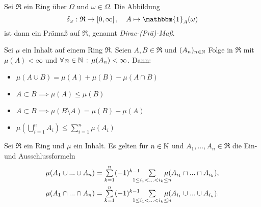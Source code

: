 \documentclass{cheat-sheet}
\newcommand{\Ring}{\mathfrak{R}} %
\newcommand{\ind}{\mathbbm{1}} %
\begin{document}
\begin{bsp}
  Sei $\Ring$ ein Ring über $\Omega$ und $\omega \in \Omega$. Die Abbildung
  \[ \delta_{\omega} : \Ring \to \left[ 0, \infty \right], \quad A \mapsto \ind_A(\omega) \]
  ist dann ein Prämaß auf $\Ring$, genannt \emph{Dirac-(Prä)-Maß}.
\end{bsp}

\begin{lem}
  Sei $\mu$ ein Inhalt auf einem Ring $\Ring$. Seien $A, B \in \Ring$ und $(A_n)_{n \in \mathbb{N}}$ Folge in $\Ring$ mit $\mu(A) < \infty$ und $\forall \, {n \in \mathbb{N}} \,:\, \mu(A_n) < \infty$. Dann:
  \begin{itemize}
    \item $\mu(A \cup B) = \mu(A) + \mu(B) - \mu(A \cap B)$
    \item $A \subset B \implies \mu(A) \leq \mu(B)$ 
    \item $A \subset B \implies \mu(B \setminus A) = \mu(B) - \mu(A)$
    \item $\mu(\bigcup_{i=1}^n A_i) \leq \sum_{i=1}^n \mu(A_i)$ 
  \end{itemize}
\end{lem}

\begin{satz}
  Sei $\Ring$ ein Ring und $\mu$ ein Inhalt. Es gelten für $n \in \mathbb{N}$ und $A_1, ..., A_n \in \Ring$ die Ein- und Ausschlussformeln
  \begin{align*}
    \mu(A_1 \cup ... \cup A_n) &= \sum_{k=1}^n (-1)^{k-1} \quad \sum_{\mathclap{1 \leq i_1 < ... < i_k \leq n}} \quad \mu(A_{i_1} \cap ... \cap A_{i_k}), \\
    \mu(A_1 \cap ... \cap A_n) &= \sum_{k=1}^n (-1)^{k-1} \quad \sum_{\mathclap{1 \leq i_1 < ... < i_k \leq n}} \quad \mu(A_{i_1} \cup ... \cup A_{i_k}).
  \end{align*}
\end{satz}
\end{document}
